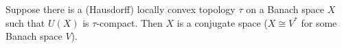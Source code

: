 Suppose there is a (Hausdorff) locally convex topology $\tau$ on a Banach space $X$ such that $U(X)$ is $\tau$-compact. Then $X$ is a conjugate space ($X \cong V^*$ for some Banach space $V$).